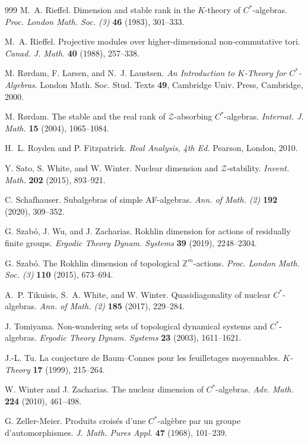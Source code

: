 \documentclass[11pt,a4paper,leqno]{amsart}
\theoremstyle{definition}
\theoremstyle{remark}
\numberwithin{equation}{section}
\theoremstyle{plain}
\newcommand{\Zb}{\mathbb{Z}}
\newcommand{\Zc}{\mathcal{Z}}
\begin{document}
\begin{thebibliography}{999}
M.~A. Rieffel.
Dimension and stable rank in the $K$-theory of $C^*$-algebras.
{\it Proc. London Math. Soc. (3)} {\bf 46} (1983), 301--333.

M.~A. Rieffel.
Projective modules over higher-dimensional non-commutative tori.
{\it Canad. J. Math.} {\bf 40} (1988), 257--338.

M. Rørdam, F. Larsen, and N.~J. Laustsen.
{\it An Introduction to $K$-Theory for $C^*$-Algebras}.
London Math. Soc. Stud. Texts {\bf 49}, Cambridge Univ. Press, Cambridge, 2000.

M. Rørdam.
The stable and the real rank of $\Zc$-absorbing $C^*$-algebras.
{\it Internat. J. Math.} {\bf 15} (2004), 1065--1084.

H.~L. Royden and P. Fitzpatrick.
{\it Real Analysis, 4th Ed.}
Pearson, London, 2010.

Y. Sato, S. White, and W. Winter.
Nuclear dimension and $\mathcal{Z}$-stability.
{\it Invent. Math.} {\bf 202} (2015), 893--921.

C. Schafhauser.
Subalgebras of simple AF-algebras.
{\it Ann. of Math. (2)} {\bf 192} (2020), 309--352. 

G. Szabó, J. Wu, and J. Zacharias.
Rokhlin dimension for actions of residually finite groups.
{\it Ergodic Theory Dynam. Systems} {\bf 39} (2019), 2248--2304.

G. Szabó.
The Rokhlin dimension of topological $\Zb^m$-actions.
{\it Proc. London Math. Soc. (3)} {\bf 110} (2015), 673--694.

A.~P. Tikuisis, S.~A. White, and W. Winter.
Quasidiagonality of nuclear $C^*$-algebras.
{\it Ann. of Math. (2)} {\bf 185} (2017), 229--284.

J. Tomiyama.
Non-wandering sets of topological dynamical systems and $C^*$-algebras.
{\it Ergodic Theory Dynam. Systems} {\bf 23} (2003), 1611--1621.

J.-L. Tu.
La conjecture de Baum--Connes pour les feuilletages moyennables.
{\it $K$-Theory} {\bf 17} (1999), 215--264.

W. Winter and J. Zacharias.
The nuclear dimension of $C^*$-algebras.
{\it Adv. Math.} {\bf 224} (2010), 461--498.

G. Zeller-Meier. 
Produits crois\'es d'une $C^*$-alg\`ebre par un groupe d'automorphismes. 
{\it J. Math. Pures Appl.} {\bf 47} (1968), 101--239.

\end{thebibliography}
\end{document}
